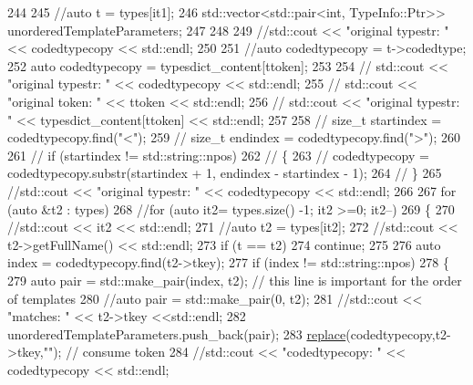 \begin{DoxyCode}
244 
245         \textcolor{comment}{//auto t = types[it1];}
246         std::vector<std::pair<int, TypeInfo::Ptr>> unorderedTemplateParameters;
247 
248         
249         \textcolor{comment}{//std::cout << "original typestr: " << codedtypecopy << std::endl;}
250 
251         \textcolor{comment}{//auto codedtypecopy = t->codedtype;}
252         \textcolor{keyword}{auto} codedtypecopy = typesdict\_content[ttoken];
253 
254         \textcolor{comment}{// std::cout << "original typestr: " << codedtypecopy << std::endl;}
255         \textcolor{comment}{// std::cout << "original token: " << ttoken << std::endl;}
256         \textcolor{comment}{// std::cout << "original typestr: " << typesdict\_content[ttoken] << std::endl;}
257 
258         \textcolor{comment}{// size\_t startindex = codedtypecopy.find("<");}
259         \textcolor{comment}{// size\_t endindex = codedtypecopy.find(">");}
260 
261         \textcolor{comment}{// if (startindex != std::string::npos)}
262         \textcolor{comment}{// \{}
263         \textcolor{comment}{//     codedtypecopy = codedtypecopy.substr(startindex + 1, endindex - startindex - 1);}
264         \textcolor{comment}{// \}}
265         \textcolor{comment}{//std::cout << "original typestr: " << codedtypecopy << std::endl;}
266 
267         \textcolor{keywordflow}{for} (\textcolor{keyword}{auto} &t2 : types)
268         \textcolor{comment}{//for (auto it2= types.size() -1; it2 >=0; it2--)}
269         \{
270             \textcolor{comment}{//std::cout << it2 << std::endl;}
271             \textcolor{comment}{//auto t2 = types[it2];}
272             \textcolor{comment}{//std::cout << t2->getFullName() << std::endl;}
273             \textcolor{keywordflow}{if} (t == t2)
274                 \textcolor{keywordflow}{continue};
275 
276             \textcolor{keyword}{auto} index = codedtypecopy.find(t2->tkey);
277             \textcolor{keywordflow}{if} (index != std::string::npos)
278             \{
279                 \textcolor{keyword}{auto} pair = std::make\_pair(index, t2); \textcolor{comment}{// this line is important for the order of templates}
280                 \textcolor{comment}{//auto pair = std::make\_pair(0, t2);}
281                 \textcolor{comment}{//std::cout << "matches: " << t2->tkey <<std::endl;}
282                 unorderedTemplateParameters.push\_back(pair);
283                 \hyperlink{namespacesmacc_1_1introspection_a48571b9bf3b115d2a83cc0147c96d0bd}{replace}(codedtypecopy,t2->tkey,\textcolor{stringliteral}{""}); \textcolor{comment}{// consume token}
284                 \textcolor{comment}{//std::cout << "codedtypecopy: " << codedtypecopy << std::endl;}

\end{DoxyCode}
